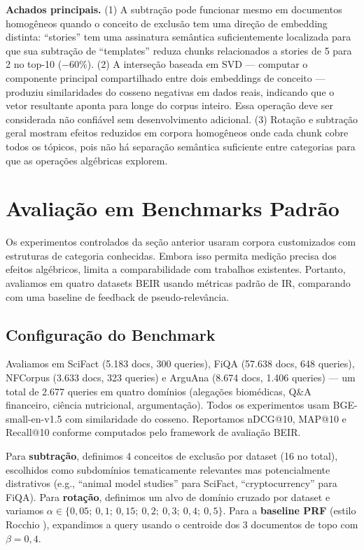 \documentclass{article}
\begin{document}
\textbf{Achados principais.} (1) A subtração pode funcionar mesmo em documentos homogêneos quando o conceito de exclusão tem uma direção de embedding distinta: ``stories'' tem uma assinatura semântica suficientemente localizada para que sua subtração de ``templates'' reduza chunks relacionados a stories de 5 para 2 no top-10 ($-60\%$). (2) A interseção baseada em SVD --- computar o componente principal compartilhado entre dois embeddings de conceito --- produziu similaridades do cosseno negativas em dados reais, indicando que o vetor resultante aponta para longe do corpus inteiro. Essa operação deve ser considerada não confiável sem desenvolvimento adicional. (3) Rotação e subtração geral mostram efeitos reduzidos em corpora homogêneos onde cada chunk cobre todos os tópicos, pois não há separação semântica suficiente entre categorias para que as operações algébricas explorem.

\section{Avaliação em Benchmarks Padrão}

Os experimentos controlados da seção anterior usaram corpora customizados com estruturas de categoria conhecidas. Embora isso permita medição precisa dos efeitos algébricos, limita a comparabilidade com trabalhos existentes. Portanto, avaliamos em quatro datasets BEIR \cite{thakur2021} usando métricas padrão de IR, comparando com uma baseline de feedback de pseudo-relevância.

\subsection{Configuração do Benchmark}

Avaliamos em SciFact (5.183 docs, 300 queries), FiQA (57.638 docs, 648 queries), NFCorpus (3.633 docs, 323 queries) e ArguAna (8.674 docs, 1.406 queries) --- um total de 2.677 queries em quatro domínios (alegações biomédicas, Q\&A financeiro, ciência nutricional, argumentação). Todos os experimentos usam BGE-small-en-v1.5 com similaridade do cosseno. Reportamos nDCG@10, MAP@10 e Recall@10 conforme computados pelo framework de avaliação BEIR.

Para \textbf{subtração}, definimos 4 conceitos de exclusão por dataset (16 no total), escolhidos como subdomínios tematicamente relevantes mas potencialmente distrativos (e.g., ``animal model studies'' para SciFact, ``cryptocurrency'' para FiQA). Para \textbf{rotação}, definimos um alvo de domínio cruzado por dataset e variamos $\alpha \in \{0{,}05;\ 0{,}1;\ 0{,}15;\ 0{,}2;\ 0{,}3;\ 0{,}4;\ 0{,}5\}$. Para a \textbf{baseline PRF} (estilo Rocchio \cite{rocchio1971}), expandimos a query usando o centroide dos 3 documentos de topo com $\beta = 0{,}4$.
\end{document}
